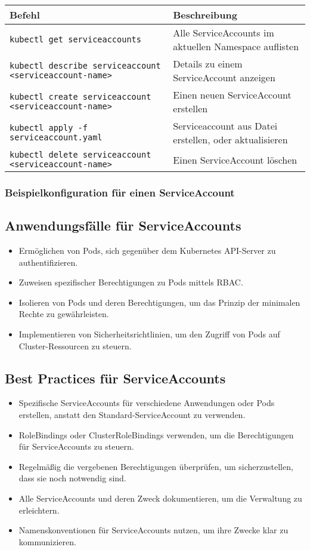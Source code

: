 \noindent
\begin{tabular}{
|p{}|p{}|}
\hline
\textbf{Befehl} & \textbf{Beschreibung} \\
\hline
\texttt{kubectl get serviceaccounts} & Alle ServiceAccounts im aktuellen Namespace auflisten \\
\texttt{kubectl describe serviceaccount <serviceaccount-name>} & Details zu einem ServiceAccount anzeigen \\
\texttt{kubectl create serviceaccount <serviceaccount-name>} & Einen neuen ServiceAccount erstellen \\
\texttt{kubectl apply -f serviceaccount.yaml} & Serviceaccount aus Datei erstellen, oder aktualisieren\\
\texttt{kubectl delete serviceaccount <serviceaccount-name>} & Einen ServiceAccount löschen \\
\hline
\end{tabular}

\subsubsection{Beispielkonfiguration für einen ServiceAccount}


\subsection{Anwendungsfälle für ServiceAccounts}
\begin{itemize}
    \item Ermöglichen von Pods, sich gegenüber dem Kubernetes API-Server zu authentifizieren.
    \item Zuweisen spezifischer Berechtigungen zu Pods mittels RBAC.
    \item Isolieren von Pods und deren Berechtigungen, um das Prinzip der minimalen Rechte zu gewährleisten.
    \item Implementieren von Sicherheitsrichtlinien, um den Zugriff von Pods auf Cluster-Ressourcen zu steuern.
\end{itemize}

\subsection{Best Practices für ServiceAccounts}
\begin{itemize}
    \item Spezifische ServiceAccounts für verschiedene Anwendungen oder Pods erstellen, anstatt den Standard-ServiceAccount zu verwenden.
    \item RoleBindings oder ClusterRoleBindings verwenden, um die Berechtigungen für ServiceAccounts zu steuern.
    \item Regelmäßig die vergebenen Berechtigungen überprüfen, um sicherzustellen, dass sie noch notwendig sind.
    \item Alle ServiceAccounts und deren Zweck dokumentieren, um die Verwaltung zu erleichtern.
    \item Namenskonventionen für ServiceAccounts nutzen, um ihre Zwecke klar zu kommunizieren.
\end{itemize}

